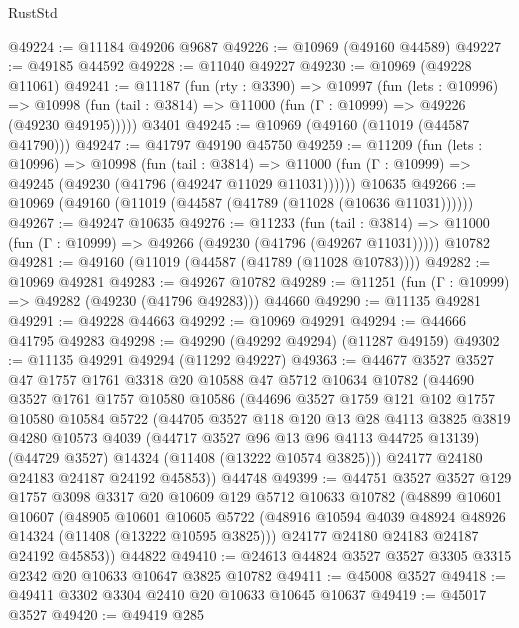 \begin{lexlean}{RustStd}
\begin{coremodule}
@49224 := @11184 @49206 @9687
@49226 := @10969 (@49160 @44589)
@49227 := @49185 @44592
@49228 := @11040 @49227
@49230 := @10969 (@49228 @11061)
@49241 := @11187
    (fun (rty : @3390) =>
    @10997
      (fun (lets : @10996) =>
      @10998 (fun (tail : @3814) => @11000 (fun (Γ : @10999) => @49226 (@49230 @49195)))))
    @3401
@49245 := @10969 (@49160 (@11019 (@44587 @41790)))
@49247 := @41797 @49190 @45750
@49259 := @11209
    (fun (lets : @10996) =>
    @10998
      (fun (tail : @3814) =>
      @11000 (fun (Γ : @10999) => @49245 (@49230 (@41796 (@49247 @11029 @11031))))))
    @10635
@49266 := @10969 (@49160 (@11019 (@44587 (@41789 (@11028 (@10636 @11031))))))
@49267 := @49247 @10635
@49276 := @11233
    (fun (tail : @3814) => @11000 (fun (Γ : @10999) => @49266 (@49230 (@41796 (@49267 @11031)))))
    @10782
@49281 := @49160 (@11019 (@44587 (@41789 (@11028 @10783))))
@49282 := @10969 @49281
@49283 := @49267 @10782
@49289 := @11251 (fun (Γ : @10999) => @49282 (@49230 (@41796 @49283))) @44660
@49290 := @11135 @49281
@49291 := @49228 @44663
@49292 := @10969 @49291
@49294 := @44666 @41795 @49283
@49298 := @49290 (@49292 @49294) (@11287 @49159)
@49302 := @11135 @49291 @49294 (@11292 @49227)
@49363 := @44677
    @3527
    @3527
    @47
    @1757
    @1761
    @3318
    @20
    @10588
    @47
    @5712
    @10634
    @10782
    (@44690
      @3527
      @1761
      @1757
      @10580
      @10586
      (@44696
        @3527
        @1759
        @121
        @102
        @1757
        @10580
        @10584
        @5722
        (@44705
          @3527
          @118
          @120
          @13
          @28
          @4113
          @3825
          @3819
          @4280
          @10573
          @4039
          (@44717 @3527 @96 @13 @96 @4113 @44725 @13139)
          (@44729 @3527)
          @14324
          (@11408 (@13222 @10574 @3825)))
        @24177
        @24180
        @24183
        @24187
        @24192
        @45853))
    @44748
@49399 := @44751
    @3527
    @3527
    @129
    @1757
    @3098
    @3317
    @20
    @10609
    @129
    @5712
    @10633
    @10782
    (@48899
      @10601
      @10607
      (@48905
        @10601
        @10605
        @5722
        (@48916 @10594 @4039 @48924 @48926 @14324 (@11408 (@13222 @10595 @3825)))
        @24177
        @24180
        @24183
        @24187
        @24192
        @45853))
    @44822
@49410 := @24613 @44824 @3527 @3527 @3305 @3315 @2342 @20 @10633 @10647 @3825 @10782
@49411 := @45008 @3527
@49418 := @49411 @3302 @3304 @2410 @20 @10633 @10645 @10637
@49419 := @45017 @3527
@49420 := @49419 @285

\end{coremodule}
\end{lexlean}
